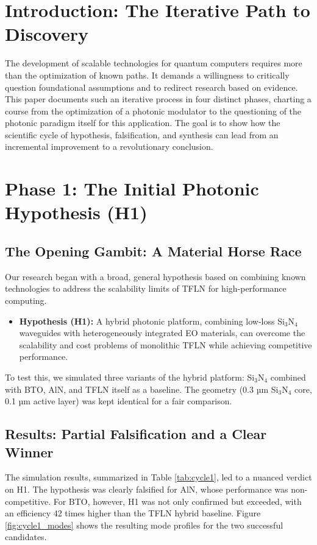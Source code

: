 \documentclass[12pt, a4paper, numbers]{report}
\begin{document}
\chapter{Introduction: The Iterative Path to Discovery}
The development of scalable technologies for quantum computers requires more than the optimization of known paths. It demands a willingness to critically question foundational assumptions and to redirect research based on evidence. This paper documents such an iterative process in four distinct phases, charting a course from the optimization of a photonic modulator to the questioning of the photonic paradigm itself for this application. The goal is to show how the scientific cycle of hypothesis, falsification, and synthesis can lead from an incremental improvement to a revolutionary conclusion.

\chapter{Phase 1: The Initial Photonic Hypothesis (H1)}
\section{The Opening Gambit: A Material Horse Race}
Our research began with a broad, general hypothesis based on combining known technologies to address the scalability limits of TFLN for high-performance computing.
\begin{itemize}
    \item \textbf{Hypothesis (H1):} A hybrid photonic platform, combining low-loss Si$_3$N$_4$ waveguides with heterogeneously integrated EO materials, can overcome the scalability and cost problems of monolithic TFLN while achieving competitive performance.
\end{itemize}
To test this, we simulated three variants of the hybrid platform: Si$_3$N$_4$ combined with BTO, AlN, and TFLN itself as a baseline. The geometry (0.3 µm Si$_3$N$_4$ core, 0.1 µm active layer) was kept identical for a fair comparison.

\section{Results: Partial Falsification and a Clear Winner}
The simulation results, summarized in Table \ref{tab:cycle1}, led to a nuanced verdict on H1. The hypothesis was clearly falsified for AlN, whose performance was non-competitive. For BTO, however, H1 was not only confirmed but exceeded, with an efficiency 42 times higher than the TFLN hybrid baseline. Figure \ref{fig:cycle1_modes} shows the resulting mode profiles for the two successful candidates.
\end{document}
